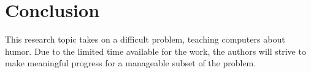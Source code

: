
\section{Conclusion}

This research topic takes on a difficult problem, teaching computers about humor. Due to the limited time available for the work, the authors will strive to make meaningful progress for a manageable subset of the problem.  